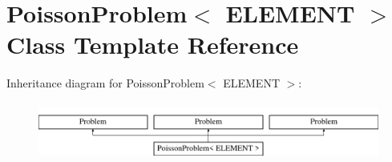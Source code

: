 \hypertarget{classPoissonProblem}{}\section{Poisson\+Problem$<$ E\+L\+E\+M\+E\+NT $>$ Class Template Reference}
\label{classPoissonProblem}
Inheritance diagram for Poisson\+Problem$<$ E\+L\+E\+M\+E\+NT $>$\+:\begin{figure}[H]
\begin{center}
\leavevmode
\includegraphics[height=1.944445cm]{classPoissonProblem}
\end{center}
\end{figure}
